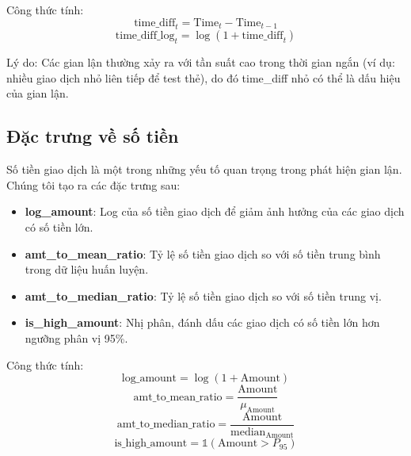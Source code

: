 Công thức tính:
\begin{equation}
\text{time\_diff}_t = \text{Time}_t - \text{Time}_{t-1}
\end{equation}
\begin{equation}
\text{time\_diff\_log}_t = \log(1 + \text{time\_diff}_t)
\end{equation}

Lý do: Các gian lận thường xảy ra với tần suất cao trong thời gian ngắn (ví dụ: nhiều giao dịch nhỏ liên tiếp để test thẻ), do đó time\_diff nhỏ có thể là dấu hiệu của gian lận.

\subsection{Đặc trưng về số tiền}

Số tiền giao dịch là một trong những yếu tố quan trọng trong phát hiện gian lận. Chúng tôi tạo ra các đặc trưng sau:

\begin{itemize}
    \item \textbf{log\_amount}: Log của số tiền giao dịch để giảm ảnh hưởng của các giao dịch có số tiền lớn.
    
    \item \textbf{amt\_to\_mean\_ratio}: Tỷ lệ số tiền giao dịch so với số tiền trung bình trong dữ liệu huấn luyện.
    
    \item \textbf{amt\_to\_median\_ratio}: Tỷ lệ số tiền giao dịch so với số tiền trung vị.
    
    \item \textbf{is\_high\_amount}: Nhị phân, đánh dấu các giao dịch có số tiền lớn hơn ngưỡng phân vị 95\%.
\end{itemize}

Công thức tính:
\begin{equation}
\text{log\_amount} = \log(1 + \text{Amount})
\end{equation}
\begin{equation}
\text{amt\_to\_mean\_ratio} = \frac{\text{Amount}}{\mu_{\text{Amount}}}
\end{equation}
\begin{equation}
\text{amt\_to\_median\_ratio} = \frac{\text{Amount}}{\text{median}_{\text{Amount}}}
\end{equation}
\begin{equation}
\text{is\_high\_amount} = \mathbb{1}(\text{Amount} > P_{95})
\end{equation}

